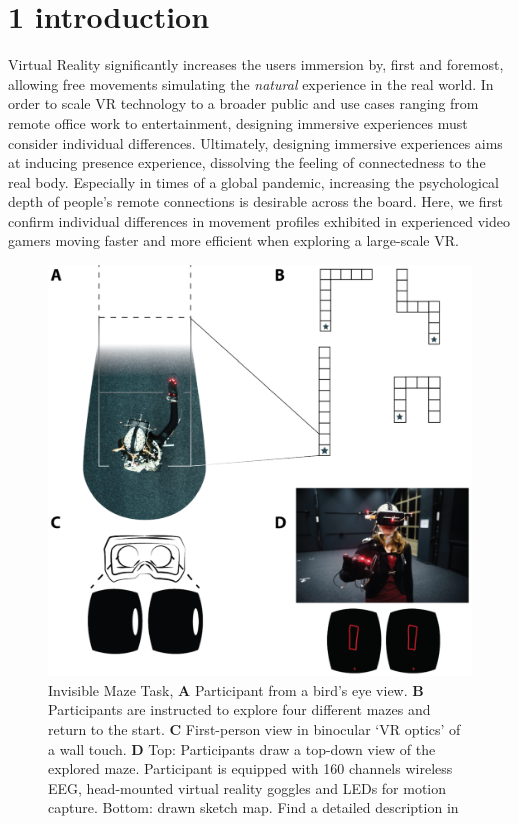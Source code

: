 \section{1 introduction}
Virtual Reality significantly increases the users immersion by, first and foremost, allowing free movements simulating the \textit{natural} experience in the real world. In order to scale VR technology to a broader public and use cases ranging from remote office work to entertainment, designing immersive experiences must consider individual differences. Ultimately, designing immersive experiences aims at inducing presence experience, dissolving the feeling of connectedness to the real body. Especially in times of a global pandemic, increasing the psychological depth of people's remote connections is desirable across the board. Here, we first confirm individual differences in movement profiles exhibited in experienced video gamers moving faster and more efficient when exploring a large-scale VR. %
\begin{figure}[!t]
\centering
    \includegraphics[width=\linewidth]{figures/IMT_Task.png}
    \caption{Invisible Maze Task, \textbf{A} Participant from a bird’s eye view. \textbf{B} Participants are instructed to explore four different mazes and return to the start. \textbf{C} First-person view in binocular `VR optics' of a wall touch. \textbf{D} Top: Participants draw a top-down view of the explored maze. Participant is equipped with 160 channels wireless EEG, head-mounted virtual reality goggles and LEDs for motion capture. Bottom: drawn sketch map. Find a detailed description in \cite{Gehrke2018}}
    \label{imt_task}
\end{figure}
